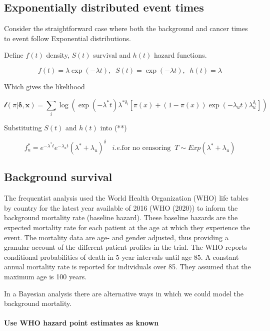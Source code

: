 \documentclass[
]{article}
\begin{document}
\hypertarget{exponentially-distributed-event-times}{%
\subsection{Exponentially distributed event
times}\label{exponentially-distributed-event-times}}

Consider the straightforward case where both the background and cancer
times to event follow Exponential distributions.

Define \(f(t)\) density, \(S(t)\) survival and \(h(t)\) hazard
functions.

\[
f(t) = \lambda \exp(-\lambda t), \;\; S(t) = \exp(-\lambda t), \;\; h(t) = \lambda
\]

Which gives the likelihood

\[
\mathcal{l}(\pi | \boldsymbol{\delta}, \boldsymbol{x}) =
 \sum_i \log(\exp(-\lambda^* t) \lambda^{* \delta_i}[\pi(x) +
   (1 − \pi(x)) \exp(-\lambda_u t) \lambda_u^{\delta_i}])
\]

Substituting \(S(t)\) and \(h(t)\) into (**)

\[
f^*_u = e^{-\lambda^* t} e^{-\lambda_u t} (\lambda^* + \lambda_u)^{\delta} \;\;\; i.e. \mbox{for no censoring} \;\; T \sim Exp(\lambda^* + \lambda_u)
\]

\hypertarget{background-survival}{%
\subsection{Background survival}\label{background-survival}}

The frequentist analysis used the World Health Organization (WHO) life
tables by country for the latest year available of 2016 (WHO (2020)) to
inform the background mortality rate (baseline hazard). These baseline
hazards are the expected mortality rate for each patient at the age at
which they experience the event. The mortality data are age- and gender
adjusted, thus providing a granular account of the different patient
profiles in the trial. The WHO reports conditional probabilities of
death in 5-year intervals until age 85. A constant annual mortality rate
is reported for individuals over 85. They assumed that the maximum age
is 100 years.

In a Bayesian analysis there are alternative ways in which we could
model the background mortality.

\hypertarget{use-who-hazard-point-estimates-as-known}{%
\paragraph{Use WHO hazard point estimates as
known}\label{use-who-hazard-point-estimates-as-known}}
\end{document}
